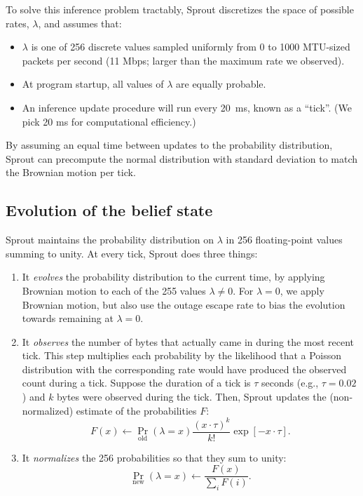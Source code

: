 To solve this inference problem tractably, Sprout discretizes the
space of possible rates, $\lambda$, and assumes that:

\begin{itemize}

\item $\lambda$ is one of 256 discrete values sampled uniformly from 0
  to 1000 MTU-sized packets per second (11 Mbps; larger than
  the maximum rate we observed).

\item At program startup, all values of $\lambda$ are equally
  probable.

\item An inference update procedure will run every 20~ms, known as a
  ``tick''. (We pick 20 ms for computational efficiency.)


\end{itemize}

By assuming an equal time between updates to the probability
distribution, Sprout can precompute the normal distribution with
standard deviation to match the Brownian motion per tick.

\subsection{Evolution of the belief state}

Sprout maintains the probability distribution on $\lambda$ in 256
floating-point values summing to unity. At every tick, Sprout does
three things:

\begin{enumerate}

\item It \emph{evolves} the probability distribution to the current
  time, by applying Brownian motion to each of the 255 values $\lambda
  \not = 0$. For $\lambda = 0$, we apply Brownian motion, but also use
  the outage escape rate to bias the evolution towards remaining at
  $\lambda = 0$.
  
\item It \emph{observes} the number of bytes that actually came in
  during the most recent tick. This step multiplies each probability
  by the likelihood that a Poisson distribution with the corresponding
  rate would have produced the observed count during a tick. Suppose
  the duration of a tick is $\tau$ seconds (e.g., $\tau = 0.02$) and
  $k$ bytes were observed during the tick. Then, Sprout updates the
  (non-normalized) estimate of the probabilities $F$:
 $$
 F(x) \leftarrow
 \Pr_{\textrm{old}}(\lambda = x) \frac{(x \cdot \tau)^k}{k!}  \exp[-x \cdot \tau].
 $$

\item It \emph{normalizes} the 256 probabilities so that they sum to unity:
$$
\Pr_{\textrm{new}}(\lambda = x) \leftarrow \frac{F(x)}{\sum_i F(i)} .
$$
\end{enumerate}

